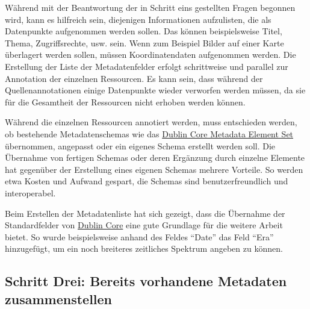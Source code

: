 \documentclass[
  nswissgerman,
  letterpaper,
  DIV=11,
  numbers=noendperiod]{scrartcl}
\begin{document}
Während mit der Beantwortung der in Schritt eins gestellten Fragen
begonnen wird, kann es hilfreich sein, diejenigen Informationen
aufzulisten, die als Datenpunkte aufgenommen werden sollen. Das können
beispielsweise Titel, Thema, Zugriffsrechte, usw. sein. Wenn zum
Beispiel Bilder auf einer Karte überlagert werden sollen, müssen
Koordinatendaten aufgenommen werden. Die Erstellung der Liste der
Metadatenfelder erfolgt schrittweise und parallel zur Annotation der
einzelnen Ressourcen. Es kann sein, dass während der Quellenannotationen
einige Datenpunkte wieder verworfen werden müssen, da sie für die
Gesamtheit der Ressourcen nicht erhoben werden können.

Während die einzelnen Ressourcen annotiert werden, muss entschieden
werden, ob bestehende Metadatenschemas wie das
\href{https://www.dublincore.org/specifications/dublin-core/dces/}{Dublin
Core Metadata Element Set} übernommen, angepasst oder ein eigenes Schema
erstellt werden soll. Die Übernahme von fertigen Schemas oder deren
Ergänzung durch einzelne Elemente hat gegenüber der Erstellung eines
eigenen Schemas mehrere Vorteile. So werden etwa Kosten und Aufwand
gespart, die Schemas sind benutzerfreundlich und interoperabel.

\begin{tcolorbox}[enhanced jigsaw, arc=.35mm, bottomrule=.15mm, bottomtitle=1mm, breakable, colback=white, colbacktitle=quarto-callout-tip-color!10!white, colframe=quarto-callout-tip-color-frame, coltitle=black, left=2mm, leftrule=.75mm, opacityback=0, opacitybacktitle=0.6, rightrule=.15mm, title=\textcolor{quarto-callout-tip-color}{\faLightbulb}\hspace{0.5em}{Erfahrungen der Stadt.Geschichte.Basel}, titlerule=0mm, toprule=.15mm, toptitle=1mm]

Beim Erstellen der Metadatenliste hat sich gezeigt, dass die Übernahme
der Standardfelder von \href{https://www.dublincore.org}{Dublin Core}
eine gute Grundlage für die weitere Arbeit bietet. So wurde
beispielsweise anhand des Feldes ``Date'' das Feld ``Era'' hinzugefügt,
um ein noch breiteres zeitliches Spektrum angeben zu können.

\end{tcolorbox}

\subsection{Schritt Drei: Bereits vorhandene Metadaten
zusammenstellen}\label{schritt-drei-bereits-vorhandene-metadaten-zusammenstellen}
\end{document}
